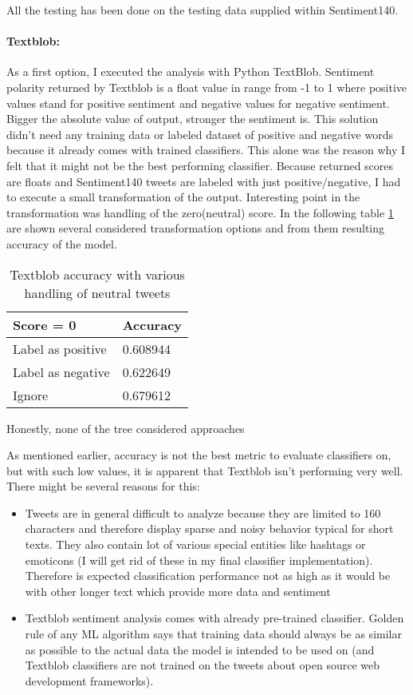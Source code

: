 All the testing has been done on the testing data supplied within Sentiment140.

\paragraph{Textblob:}
As a first option, I executed the analysis with Python TextBlob. Sentiment polarity returned by Textblob is a float value in range from -1 to 1 where positive values stand for positive sentiment and negative values for negative sentiment. Bigger the absolute value of output, stronger the sentiment is. This solution didn't need any training data or labeled dataset of positive and negative words because it already comes with trained classifiers. This alone was the reason why I felt that it might not be the best performing classifier. Because returned scores are floats and Sentiment140 tweets are labeled with just positive/negative, I had to execute a small transformation of the output. Interesting point in the transformation was handling of the zero(neutral) score. In the following table \ref{table:TextblobNeutralTweetResolvingResults} are shown several considered transformation options and from them resulting accuracy of the model. 

\begin{table}[H]
\centering
\begin{tabular}{ |p{3cm}||p{3cm}|}
 \hline
\textbf{ Score = 0 }& \textbf{Accuracy}\\
 \hline
 Label as positive   & 0.608944\\ \hline
 Label as negative & 0.622649\\ \hline
 Ignore & 0.679612\\ \hline 
\end{tabular}
\caption{Textblob accuracy with various handling of neutral tweets}
\label{table:TextblobNeutralTweetResolvingResults}
\end{table}

Honestly, none of the tree considered approaches


As mentioned earlier, accuracy is not the best metric to evaluate classifiers on, but with such low values, it is apparent that Textblob isn't performing very well. There might be several reasons for this:
\begin{itemize}
\item Tweets are in general difficult to analyze because they are limited to 160 characters and therefore display sparse and noisy behavior typical for short texts. They also contain lot of various special entities like hashtags or emoticons (I will get rid of these in my final classifier implementation). Therefore is expected classification performance not as high as it would be with other longer text which provide more data and sentiment
\item Textblob sentiment analysis comes with already pre-trained classifier. Golden rule of any ML algorithm says that training data should always be as similar as possible to the actual data the model is intended to be used on (and Textblob classifiers are not trained on the tweets about open source web development frameworks).
\end{itemize}

